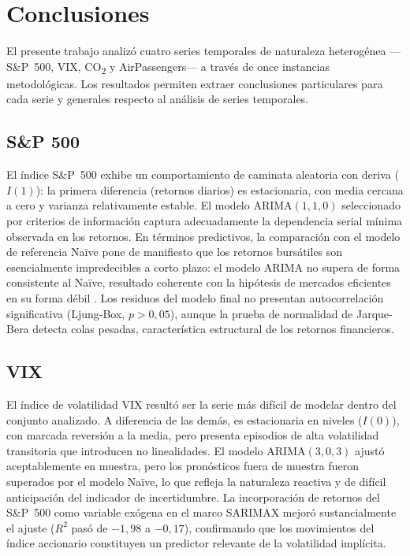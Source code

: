 \documentclass[12pt, a4paper]{article}
\begin{document}
\newpage
\section{Conclusiones}

El presente trabajo analizó cuatro series temporales de naturaleza heterogénea —S\&P~500, VIX, CO\textsubscript{2} y AirPassengers— a través de once instancias metodológicas. Los resultados permiten extraer conclusiones particulares para cada serie y generales respecto al análisis de series temporales.

\subsection*{S\&P 500}

El índice S\&P~500 exhibe un comportamiento de caminata aleatoria con deriva ($I(1)$): la primera diferencia (retornos diarios) es estacionaria, con media cercana a cero y varianza relativamente estable. El modelo ARIMA$(1,1,0)$ seleccionado por criterios de información captura adecuadamente la dependencia serial mínima observada en los retornos. En términos predictivos, la comparación con el modelo de referencia Naïve pone de manifiesto que los retornos bursátiles son esencialmente impredecibles a corto plazo: el modelo ARIMA no supera de forma consistente al Naïve, resultado coherente con la hipótesis de mercados eficientes en su forma débil \cite{hamilton1994}. Los residuos del modelo final no presentan autocorrelación significativa (Ljung-Box, $p > 0{,}05$), aunque la prueba de normalidad de Jarque-Bera detecta colas pesadas, característica estructural de los retornos financieros.

\subsection*{VIX}

El índice de volatilidad VIX resultó ser la serie más difícil de modelar dentro del conjunto analizado. A diferencia de las demás, es estacionaria en niveles ($I(0)$), con marcada reversión a la media, pero presenta episodios de alta volatilidad transitoria que introducen no linealidades. El modelo ARIMA$(3,0,3)$ ajustó aceptablemente en muestra, pero los pronósticos fuera de muestra fueron superados por el modelo Naïve, lo que refleja la naturaleza reactiva y de difícil anticipación del indicador de incertidumbre. La incorporación de retornos del S\&P~500 como variable exógena en el marco SARIMAX mejoró sustancialmente el ajuste ($R^2$ pasó de $-1{,}98$ a $-0{,}17$), confirmando que los movimientos del índice accionario constituyen un predictor relevante de la volatilidad implícita.
\end{document}
